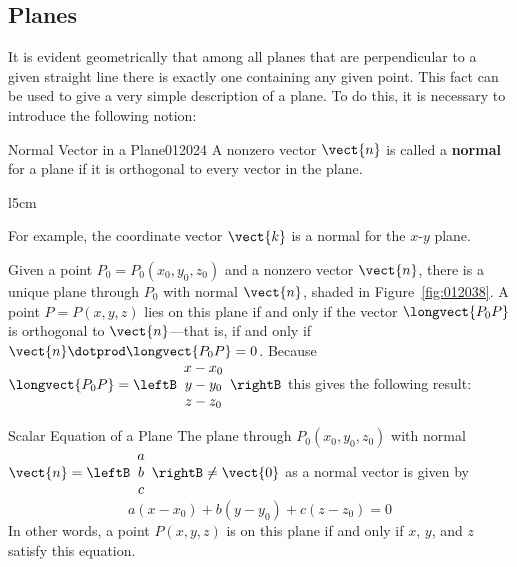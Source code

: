\subsection*{Planes}


It
 is evident geometrically that among all planes that are perpendicular 
to a given straight line there is exactly one containing any given 
point. This fact can be used to give a very simple description of a 
plane. To do this, it is necessary to introduce the following notion:

\begin{definition}{Normal Vector in a Plane}{012024}
A nonzero vector $\vect{n}$ is called a \textbf{normal} for a plane if it is orthogonal to every vector in the plane.
\end{definition}

\begin{wrapfigure}[6]{l}{5cm} 
\centering

\caption{\label{fig:012038}}
\end{wrapfigure}

\noindent For example, the coordinate vector $\vect{k}$ is a normal for the $x$-$y$ plane.

Given a point $P_{0} = P_{0}(x_{0}, y_{0}, z_{0})$ and a nonzero vector $\vect{n}$, there is a unique plane through $P_{0}$ with normal $\vect{n}$, shaded in Figure~\ref{fig:012038}. A point $P = P(x, y, z)$ lies on this plane if and only if the vector $\longvect{P_{0}P}$ is orthogonal to $\vect{n}$---that is, if and only if $\vect{n} \dotprod \longvect{P_{0}P} = 0$. Because $\longvect{P_{0}P} = \leftB
\begin{array}{c}
x - x_{0}\\
y - y_{0}\\
z - z_{0}
\end{array}
\rightB$ this gives the following result:
\vspace{1em}

\begin{theorem*}[label=thm:012039]{Scalar Equation of a Plane}
The plane through $P_{0}(x_{0}, y_{0}, z_{0})$ with normal $\vect{n} = \leftB
\begin{array}{c}
a\\
b\\
c
\end{array}
\rightB
\neq \vect{0}$ 
 as a normal vector is given by
\begin{equation*}
a(x - x_{0}) + b(y - y_{0}) + c(z - z_{0}) = 0
\end{equation*}
In other words, a point $P(x, y, z)$ is on this plane if and only if $x$, $y$, and $z$ satisfy this equation.
\end{theorem*}

